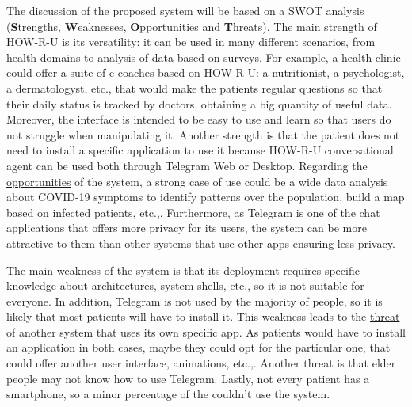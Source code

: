 \documentclass[12pt,english]{article}
\begin{document}
The discussion of the proposed system will be based on a SWOT analysis (\textbf{S}trengths, \textbf{W}eaknesses, \textbf{O}pportunities and \textbf{T}hreats). The main \underline{strength} of HOW-R-U is its versatility: it can be used in many different scenarios, from health domains to analysis of data based on surveys. For example, a health clinic could offer a suite of e-coaches based on HOW-R-U: a nutritionist, a psychologist, a dermatologyst, etc., that would make the patients regular questions so that their daily status is tracked by doctors, obtaining a big quantity of useful data.  Moreover, the interface is intended to be easy to use and learn so that users do not struggle when manipulating it. Another strength is that the patient does not need to install a specific application to use it because HOW-R-U conversational agent can be used both through Telegram Web or Desktop. Regarding the \underline{opportunities} of the system, a strong case of use could be a wide data analysis about COVID-19 symptoms to identify patterns over the population, build a map based on infected patients, etc.,. Furthermore, as Telegram is one of the chat applications that offers more privacy for its users, the system can be more attractive to them than other systems that use other apps ensuring less privacy.


The main \underline{weakness} of the system is that its deployment requires specific knowledge about architectures, system shells, etc., so it is not suitable for everyone. In addition,  Telegram is not used by the majority of people, so it is likely that most patients will have to install it. This weakness leads to the  \underline{threat} of another system that uses its own specific app. As patients would have to install an application in both cases, maybe they could opt for the particular one, that could offer another user interface, animations, etc.,. Another threat is that elder people may not know how to use Telegram. Lastly, not every patient has a smartphone, so a minor percentage of the couldn't use the system.
\end{document}
